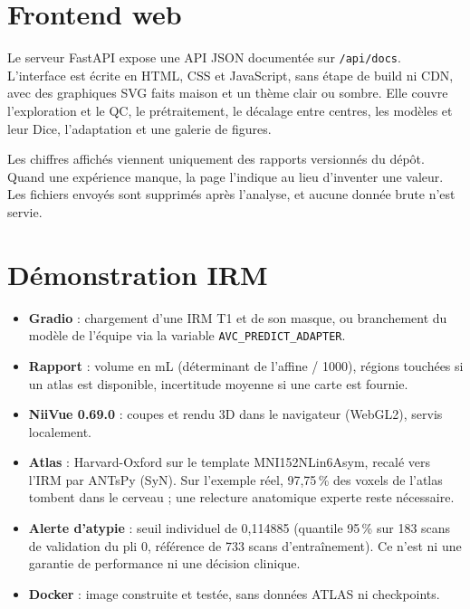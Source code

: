 \documentclass[11pt,a4paper]{report}
\newcommand{\fichier}[1]{\texttt{#1}}
\begin{document}
\section{Frontend web}

Le serveur FastAPI expose une API JSON documentée sur \fichier{/api/docs}.
L'interface est écrite en HTML, CSS et JavaScript, sans étape de build ni
CDN, avec des graphiques SVG faits maison et un thème clair ou sombre. Elle
couvre l'exploration et le QC, le prétraitement, le décalage entre centres,
les modèles et leur Dice, l'adaptation et une galerie de figures.

Les chiffres affichés viennent uniquement des rapports versionnés du dépôt.
Quand une expérience manque, la page l'indique au lieu d'inventer une
valeur. Les fichiers envoyés sont supprimés après l'analyse, et aucune
donnée brute n'est servie.

\section{Démonstration IRM}

\begin{itemize}
  \item \textbf{Gradio} : chargement d'une IRM T1 et de son masque, ou
        branchement du modèle de l'équipe via la variable
        \fichier{AVC\_PREDICT\_ADAPTER}.
  \item \textbf{Rapport} : volume en mL (déterminant de l'affine / 1000),
        régions touchées si un atlas est disponible, incertitude moyenne si
        une carte est fournie.
  \item \textbf{NiiVue 0.69.0} : coupes et rendu 3D dans le navigateur
        (WebGL2), servis localement.
  \item \textbf{Atlas} : Harvard-Oxford sur le template MNI152NLin6Asym,
        recalé vers l'IRM par ANTsPy (SyN). Sur l'exemple réel, 97,75\,\% des
        voxels de l'atlas tombent dans le cerveau ; une relecture anatomique
        experte reste nécessaire.
  \item \textbf{Alerte d'atypie} : seuil individuel de 0,114885 (quantile
        95\,\% sur 183 scans de validation du pli 0, référence de 733 scans
        d'entraînement). Ce n'est ni une garantie de performance ni une
        décision clinique.
  \item \textbf{Docker} : image construite et testée, sans données ATLAS ni
        checkpoints.
\end{itemize}
\end{document}
